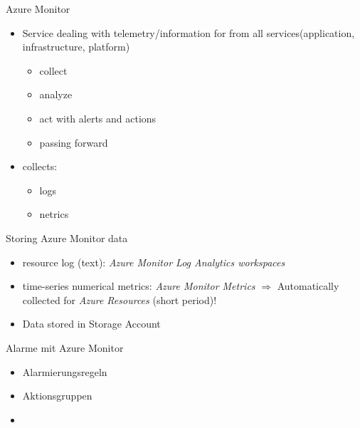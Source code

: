 

\begin{flashcard}[Definition]{Azure Monitor}
  \begin{itemize}
    \item Service dealing with telemetry/information for from all services\newline (application, infrastructure, platform)
      \begin{itemize}
        \item collect
        \item analyze
        \item act with alerts and actions
        \item passing forward
      \end{itemize}
 
    \item collects:
      \begin{itemize}
        \item logs
        \item netrics
      \end{itemize}
  \end{itemize}
\end{flashcard}

\begin{flashcard}[Definition]{Storing Azure Monitor data}
  \begin{itemize}
    \item resource log (text): \emph{Azure Monitor Log Analytics workspaces}
    \item time-series numerical metrics: \emph{Azure Monitor Metrics}\newline
      $\Rightarrow$ Automatically collected for \emph{Azure Resources} (short period)!
    \item Data stored in Storage Account
  \end{itemize}
\end{flashcard}

\begin{flashcard}[Definition]{Alarme mit Azure Monitor}
  \begin{itemize}
    \item Alarmierungsregeln
    \item Aktionsgruppen
    \item 
  \end{itemize}
\end{flashcard}




